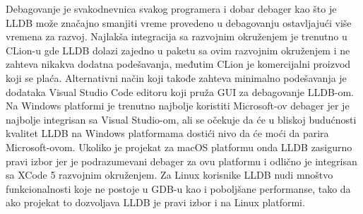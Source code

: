 \documentclass[a4paper]{article}
\begin{document}
Debagovanje je svakodnevnica svakog programera i dobar debager kao što je LLDB može značajno smanjiti vreme provedeno u debagovanju ostavljajući više vremena za razvoj. 
Najlakša integracija sa razvojnim okruženjem je trenutno u CLion-u gde LLDB dolazi zajedno u paketu sa ovim razvojnim okruženjem i ne zahteva nikakva dodatna podešavanja, međutim CLion je komercijalni proizvod koji se plaća. Alternativni način koji takođe zahteva minimalno podešavanja je dodataka Visual Studio Code editoru koji pruža GUI za debagovanje LLDB-om. Na Windows platformi je trenutno najbolje koristiti Microsoft-ov debager jer je najbolje integrisan sa Visual Studio-om, ali se očekuje da će u bliskoj budućnosti kvalitet LLDB na Windows platformama dostići nivo da će moći da parira Microsoft-ovom. Ukoliko je projekat za macOS platformu onda LLDB zasigurno pravi izbor jer je podrazumevani debager za ovu platformu i odlično je integrisan sa XCode 5 razvojnim okruženjem. Za Linux korisnike LLDB nudi mnoštvo funkcionalnosti koje ne postoje u GDB-u kao i poboljšane performanse, tako da ako projekat to dozvoljava LLDB je pravi izbor i na Linux platformi. 
\appendix
 

\end{document}
